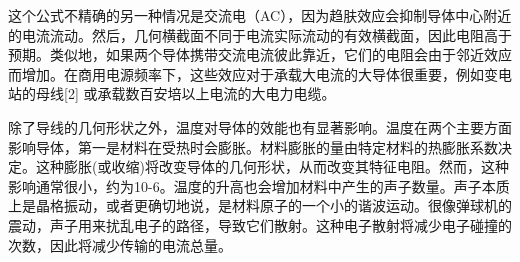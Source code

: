 这个公式不精确的另一种情况是交流电（AC），因为趋肤效应会抑制导体中心附近的电流流动。然后，几何横截面不同于电流实际流动的有效横截面，因此电阻高于预期。类似地，如果两个导体携带交流电流彼此靠近，它们的电阻会由于邻近效应而增加。在商用电源频率下，这些效应对于承载大电流的大导体很重要，例如变电站的母线[2] 或承载数百安培以上电流的大电力电缆。

除了导线的几何形状之外，温度对导体的效能也有显著影响。温度在两个主要方面影响导体，第一是材料在受热时会膨胀。材料膨胀的量由特定材料的热膨胀系数决定。这种膨胀(或收缩)将改变导体的几何形状，从而改变其特征电阻。然而，这种影响通常很小，约为10-6。温度的升高也会增加材料中产生的声子数量。声子本质上是晶格振动，或者更确切地说，是材料原子的一个小的谐波运动。很像弹球机的震动，声子用来扰乱电子的路径，导致它们散射。这种电子散射将减少电子碰撞的次数，因此将减少传输的电流总量。